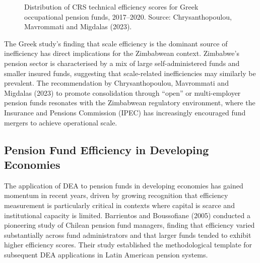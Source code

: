 \documentclass[12pt,a4paper]{article}
\begin{document}
\begin{figure}[H]
\centering
{}
\caption{Distribution of CRS technical efficiency scores for Greek occupational pension funds, 2017--2020. Source: Chrysanthopoulou, Mavrommati and Migdalas (2023).}
\label{fig:greek_distribution}
\end{figure}

The Greek study's finding that scale efficiency is the dominant source of inefficiency has direct implications for the Zimbabwean context. Zimbabwe's pension sector is characterised by a mix of large self-administered funds and smaller insured funds, suggesting that scale-related inefficiencies may similarly be prevalent. The recommendation by Chrysanthopoulou, Mavrommati and Migdalas (2023) to promote consolidation through ``open'' or multi-employer pension funds resonates with the Zimbabwean regulatory environment, where the Insurance and Pensions Commission (IPEC) has increasingly encouraged fund mergers to achieve operational scale.

\subsection{Pension Fund Efficiency in Developing Economies}

The application of DEA to pension funds in developing economies has gained momentum in recent years, driven by growing recognition that efficiency measurement is particularly critical in contexts where capital is scarce and institutional capacity is limited. Barrientos and Boussofiane (2005) conducted a pioneering study of Chilean pension fund managers, finding that efficiency varied substantially across fund administrators and that larger funds tended to exhibit higher efficiency scores. Their study established the methodological template for subsequent DEA applications in Latin American pension systems.
\end{document}
